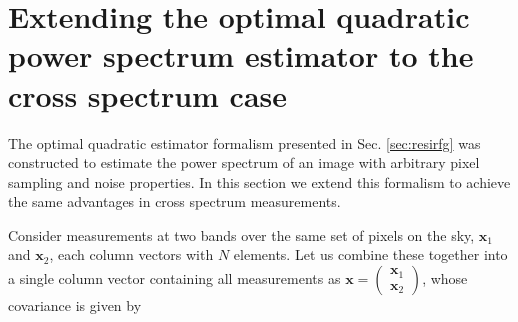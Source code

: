 \documentclass{emulateapj}
\newcommand{\xb}{\mathbf{x}}
\begin{document}
\section{Extending the optimal quadratic power spectrum estimator to the cross spectrum case}
\label{sec:optimalestimatorforcrossspectrum}

The optimal quadratic estimator formalism presented in Sec. \ref{sec:resirfg} was constructed to estimate the power spectrum of an image with arbitrary pixel sampling and noise properties. In this section we extend this formalism to achieve the same advantages in cross spectrum measurements. 

Consider measurements at two bands over the same set of pixels on the sky, $\xb_1$ and $\xb_2$, each column vectors with $N$ elements. Let us combine these together into a single column vector containing all measurements as $\xb=\left(\begin{matrix}\xb_1 \\ \xb_2  \end{matrix}\right)$, whose covariance is given by 
\end{document}
